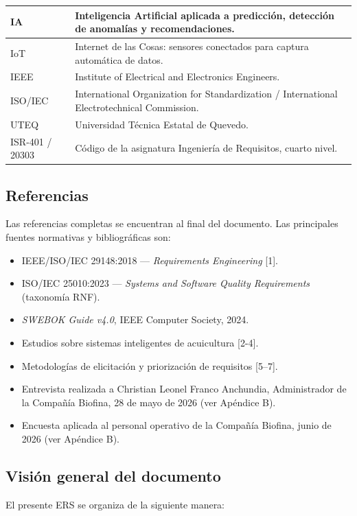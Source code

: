 \documentclass[11pt,a4paper]{article}
\begin{document}
\begin{longtable}{|p{4cm}|p{11cm}|}
IA & Inteligencia Artificial aplicada a predicción, detección de anomalías y recomendaciones. \\
\hline
IoT & Internet de las Cosas: sensores conectados para captura automática de datos. \\
\hline
IEEE & Institute of Electrical and Electronics Engineers. \\
\hline
ISO/IEC & International Organization for Standardization / International Electrotechnical Commission. \\
\hline
UTEQ & Universidad Técnica Estatal de Quevedo. \\
\hline
ISR-401 / 20303 & Código de la asignatura Ingeniería de Requisitos, cuarto nivel. \\
\hline
\end{longtable}

\subsection{Referencias}

Las referencias completas se encuentran al final del documento. Las principales fuentes normativas y bibliográficas son:

\begin{itemize}
    \item IEEE/ISO/IEC 29148:2018 --- \textit{Requirements Engineering} [1].
    \item ISO/IEC 25010:2023 --- \textit{Systems and Software Quality Requirements} (taxonomía RNF).
    \item \textit{SWEBOK Guide v4.0}, IEEE Computer Society, 2024.
    \item Estudios sobre sistemas inteligentes de acuicultura [2-4].
    \item Metodologías de elicitación y priorización de requisitos [5–7].
    \item Entrevista realizada a Christian Leonel Franco Anchundia, Administrador de la Compañía Biofina, 28 de mayo de 2026 (ver Apéndice B).
    \item Encuesta aplicada al personal operativo de la Compañía Biofina, junio de 2026 (ver Apéndice B).
\end{itemize}

\subsection{Visión general del documento}

El presente ERS se organiza de la siguiente manera:
\end{document}
